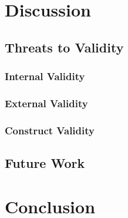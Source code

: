 \section{Discussion}\label{sec:discussion}

\subsection{Threats to Validity}

\subsubsection{Internal Validity}

\subsubsection{External Validity}

\subsubsection{Construct Validity}

\subsection{Future Work}

\section{Conclusion}\label{sec:conclusion}

\printbibliography

